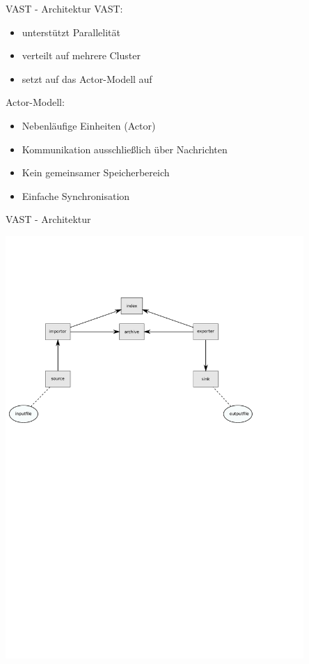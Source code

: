 \documentclass[9pt]{beamer}
\begin{document}
\begin{frame}{VAST - Architektur}{}
	VAST:
	\begin{itemize}
		\item unterstützt Parallelität
		\item verteilt auf mehrere Cluster
		\item setzt auf das Actor-Modell auf
	\end{itemize}	
	Actor-Modell:
	\begin{itemize}
		\item Nebenläufige Einheiten (Actor)
		\item Kommunikation ausschließlich über Nachrichten
		\item Kein gemeinsamer Speicherbereich
		\item Einfache Synchronisation
	\end{itemize}
\end{frame}
\begin{frame}{VAST - Architektur}{}
	\begin{center}
		\includegraphics[trim=0cm 16cm 3cm 4cm,clip,width=0.85\textwidth]{res/vast.pdf}
	\end{center}
\end{frame}
\end{document}
